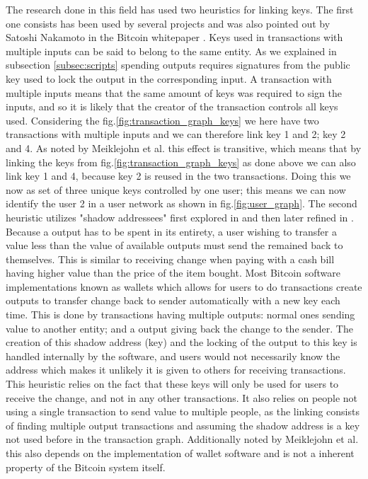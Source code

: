The research done in this field has used two heuristics for linking keys. The first one consists has been used by several projects \cite{reid2013analysis}\cite{meiklejohn2013fistful}\cite{androulaki2013evaluating}\cite{ron2013quantitative} and was also pointed out by Satoshi Nakamoto in the Bitcoin whitepaper \cite{nakamoto2008bitcoin}. Keys used in transactions with multiple inputs can be said to belong to the same entity. As we explained in subsection \ref{subsec:scripts} spending outputs requires signatures from the public key used to lock the output in the corresponding input. A transaction with multiple inputs means that the same amount of keys was required to sign the inputs, and so it is likely that the creator of the transaction controls all keys used. Considering the fig.\ref{fig:transaction_graph_keys} we here have two transactions with multiple inputs and we can therefore link key 1 and 2; key 2 and 4. As noted by Meiklejohn et al. \cite{meiklejohn2013fistful} this effect is transitive, which means that by linking the keys from fig.\ref{fig:transaction_graph_keys} as done above we can also link key 1 and 4, because key 2 is reused in the two transactions. Doing this we now as set of three unique keys controlled by one user; this means we can now identify the user 2 in a user network as shown in fig.\ref{fig:user_graph}. The second heuristic utilizes "shadow addressees" first explored in \cite{androulaki2013evaluating} and then later refined in \cite{meiklejohn2013fistful}. Because a output has to be spent in its entirety, a user wishing to transfer a value less than the value of available outputs must send the remained back to themselves. This is similar to receiving change when paying with a cash bill having higher value than the price of the item bought. Most Bitcoin software implementations known as wallets which allows for users to do transactions create outputs to transfer change back to sender automatically with a new key each time. This is done by transactions having multiple outputs: normal ones sending value to another entity; and a output giving back the change to the sender. The creation of this shadow address (key) and the locking of the output to this key is handled internally by the software, and users would not necessarily know the address which makes it unlikely it is given to others for receiving transactions. This heuristic relies on the fact that these keys will only be used for users to receive the change, and not in any other transactions. It also relies on people not using a single transaction to send value to multiple people, as the linking consists of finding multiple output transactions and assuming the shadow address is a key not used before in the transaction graph. Additionally noted by Meiklejohn et al. \cite{meiklejohn2013fistful} this also depends on the implementation of wallet software and is not a inherent property of the Bitcoin system itself. 
